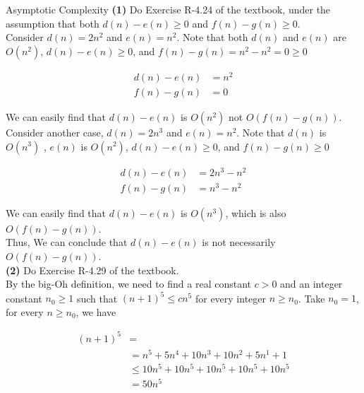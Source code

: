 \begin{homeworkProblem}{Asymptotic Complexity}
    \textbf{(1)} Do Exercise R-4.24 of the textbook, under the assumption that both
    $d(n) - e(n) \geq 0$ and $f(n) - g(n) \geq 0$.
    \\

    Consider $d(n) = 2n^2$ and $e(n) = n^2$. Note that both $d(n)$ and $e(n)$ are $O(n^2)$,
    $d(n) - e(n) \geq 0$, and $f(n) - g(n) = n^2 - n^2 = 0 \geq 0$

    \[
        \begin{split}
            d(n) - e(n) &= n^2
            \\
            f(n) - g(n) &= 0
        \end{split}
    \]

    We can easily find that $d(n) - e(n)$ is $O(n^2)$ not $O(f(n) - g(n))$. 
    \\

    Consider another case, $d(n) = 2n^3$ and $e(n) = n^2$. Note that $d(n)$ is $O(n^3)$
    , $e(n)$ is $O(n^2)$, $d(n) - e(n) \geq 0$, and $f(n) - g(n) \geq 0$

    \[
        \begin{split}
            d(n) - e(n) &= 2n^3 - n^2
            \\
            f(n) - g(n) &= n^3 - n^2
        \end{split}
    \]

    We can easily find that $d(n) - e(n)$ is $O(n^3)$, which is also $O(f(n) - g(n))$.
    \\

    Thus, We can conclude that $d(n) - e(n)$ is not necessarily $O(f(n) - g(n))$.
    \\

    \textbf{(2)} Do Exercise R-4.29 of the textbook.
    \\

    By the big-Oh definition, we need to find a real constant $c > 0$ and
    an integer constant $n_{0} \geq 1$ such that $(n + 1)^5 \leq cn^5$ for every 
    integer $n \geq n_{0}$. Take $n_{0} = 1$, for every $n \geq n_{0}$, we have

    \[
        \begin{split}
            (n + 1)^5 &= 
            \\
            &= n^5 + 5n^4 + 10n^3 + 10n^2 + 5n^1 + 1
            \\
            &\leq 10n^5 + 10n^5 + 10n^5 + 10n^5 + 10n^5
            \\
            &= 50n^5
        \end{split}
    \]


\end{homeworkProblem}

